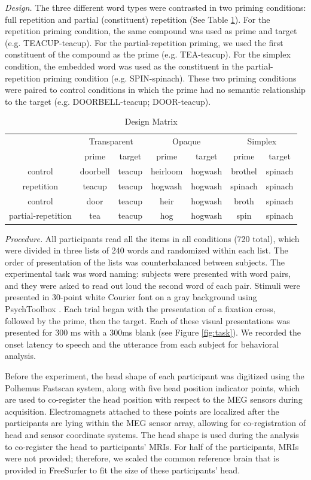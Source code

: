 \documentclass{frontiersSCNS}
\begin{document}
\textit{Design.}  The three different word types were contrasted in two priming conditions: full repetition and partial (constituent) repetition (See Table \ref{tab:Design-Matrix}).  For the repetition priming condition, the same compound was used as prime and target (e.g. TEACUP-teacup). For the partial-repetition priming, we used the first constituent of the compound as the prime (e.g. TEA-teacup). For the simplex condition, the embedded word was used as the constituent in the partial-repetition priming condition (e.g. SPIN-spinach). These two priming conditions were paired to control conditions in which the prime had no semantic relationship to the target (e.g. DOORBELL-teacup; DOOR-teacup). 

\begin{table}
\begin{tabular}{|c||c|c||c|c||c|c||}
\hline 
\multicolumn{1}{|c||}{\multirow{}{}{}} & \multicolumn{2}{c||}{Transparent} & \multicolumn{2}{c||}{Opaque} & \multicolumn{2}{c||}{Simplex}\tabularnewline
\cline{2-7} 
 & prime & target & prime & target & prime & target\tabularnewline
\hline 
\hline 
control & doorbell & teacup & heirloom & hogwash & brothel & spinach\tabularnewline
\hline 
repetition & teacup & teacup & hogwash & hogwash & spinach & spinach\tabularnewline
\hline 
\hline 
control & door & teacup & heir & hogwash & broth & spinach\tabularnewline
\hline 
partial-repetition & tea & teacup & hog & hogwash & spin & spinach\tabularnewline
\hline 
\end{tabular}\caption{\label{tab:Design-Matrix} Design Matrix}
\end{table}

\textit{Procedure.} All participants read all the items in all conditions (720 total), which were divided in three lists of 240 words and randomized within each list.  The order of presentation of the lists was counterbalanced between subjects.  The experimental task was word naming: subjects were presented with word pairs, and they were asked to read out loud the second word of each pair. Stimuli were presented in 30-point white Courier font on a gray background using PsychToolbox \citep*{Brainard:1997}. Each trial began with the presentation of a fixation cross, followed by the prime, then the target. Each of these visual presentations was presented for 300 ms with a 300ms blank (see Figure \ref{fig:task}). We recorded the onset latency to speech and the utterance from each subject for behavioral analysis.

Before the experiment, the head shape of each participant was digitized using the Polhemus Fastscan system, along with five head position indicator points, which are used to co-register the head position with respect to the MEG sensors during acquisition.  Electromagnets attached to these points are localized after the participants are lying within the MEG sensor array, allowing for co-registration of head and sensor coordinate systems.  The head shape is used during the analysis to co-register the head to participants’ MRIs. For half of the participants, MRIs were not provided; therefore, we scaled the common reference brain that is provided in FreeSurfer to fit the size of these participants' head.
\end{document}
